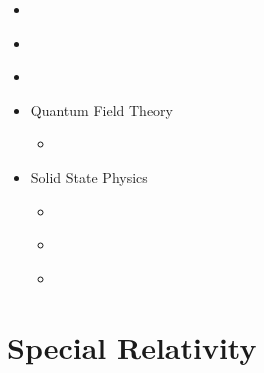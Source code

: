 \documentclass[letterpaper,10pt,english]{jupyterBook}
\begin{document}
\begin{itemize}
\begin{itemize}
\item {} 
\sphinxAtStartPar
{\hyperref[\detokenize{ch/quantum-mechanics/many-body/electromagnetic-field-quantization::doc}]{}}

\item {} 
\sphinxAtStartPar
{\hyperref[\detokenize{ch/quantum-mechanics/qft::doc}]{}}

\item {} 
\sphinxAtStartPar
{\hyperref[\detokenize{ch/quantum-mechanics/analytical-mechanics::doc}]{}}

\end{itemize}
\end{itemize}
\begin{itemize}
\item {} 
\sphinxAtStartPar
Quantum Field Theory

\begin{itemize}
\item {} 
\sphinxAtStartPar
{\hyperref[\detokenize{ch/qft/intro::doc}]{}}

\end{itemize}
\end{itemize}
\begin{itemize}
\item {} 
\sphinxAtStartPar
Solid State Physics

\begin{itemize}
\item {} 
\sphinxAtStartPar
{\hyperref[\detokenize{ch/solid-state/intro::doc}]{}}

\item {} 
\sphinxAtStartPar
{\hyperref[\detokenize{ch/solid-state/notes-solid-state::doc}]{}}

\item {} 
\sphinxAtStartPar
{\hyperref[\detokenize{ch/solid-state/semiconductors-intro::doc}]{}}

\end{itemize}
\end{itemize}

\sphinxstepscope


\part{Special Relativity}
\end{document}
